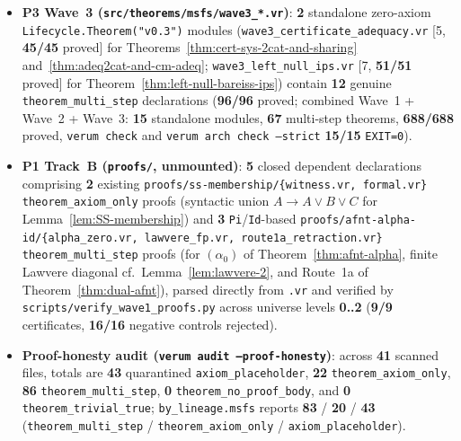 \documentclass[11pt]{article}
\theoremstyle{plain}
\theoremstyle{definition}
\begin{document}
\begin{itemize}[nosep]
\item \textbf{P3 Wave~3 (\texttt{src/\allowbreak theorems/\allowbreak msfs/\allowbreak wave3\_*.vr})}: \textbf{2} standalone zero-axiom \texttt{Lifecycle.\allowbreak Theorem("v0.3")} modules (\texttt{wave3\_\allowbreak certificate\_\allowbreak adequacy.vr} [5, \textbf{45/45} proved] for Theorems~\ref{thm:cert-sys-2cat-and-sharing} and~\ref{thm:adeq2cat-and-cm-adeq}; \texttt{wave3\_\allowbreak left\_\allowbreak null\_\allowbreak ips.vr} [7, \textbf{51/51} proved] for Theorem~\ref{thm:left-null-bareiss-ips}) contain \textbf{12} genuine \texttt{theorem\_multi\_step} declarations (\textbf{96/96} proved; combined Wave~1 + Wave~2 + Wave~3: \textbf{15} standalone modules, \textbf{67} multi-step theorems, \textbf{688/688} proved, \texttt{verum check} and \texttt{verum arch check --strict} \textbf{15/15} \texttt{EXIT=0}).
\item \textbf{P1 Track~B (\texttt{proofs/}, unmounted)}: \textbf{5} closed dependent declarations comprising \textbf{2} existing \texttt{proofs/\allowbreak ss-\allowbreak membership/\allowbreak \{witness.vr, formal.vr\}} \texttt{theorem\_axiom\_only} proofs (syntactic union $A \to A \vee B \vee C$ for Lemma~\ref{lem:SS-membership}) and \textbf{3} \texttt{Pi}/\texttt{Id}-based \texttt{proofs/\allowbreak afnt-\allowbreak alpha-\allowbreak id/\allowbreak \{alpha\_zero.vr, lawvere\_fp.vr, route1a\_retraction.vr\}} \texttt{theorem\_multi\_step} proofs (for $(\alpha_0)$ of Theorem~\ref{thm:afnt-alpha}, finite Lawvere diagonal cf.\ Lemma~\ref{lem:lawvere-2}, and Route~1a of Theorem~\ref{thm:dual-afnt}), parsed directly from \texttt{.vr} and verified by \texttt{scripts/\allowbreak verify\_\allowbreak wave1\_\allowbreak proofs.py} across universe levels \textbf{0..2} (\textbf{9/9} certificates, \textbf{16/16} negative controls rejected).
\item \textbf{Proof-honesty audit (\texttt{verum audit --proof-honesty})}: across \textbf{41} scanned files, totals are \textbf{43} quarantined \texttt{axiom\_placeholder}, \textbf{22} \texttt{theorem\_axiom\_only}, \textbf{86} \texttt{theorem\_multi\_step}, \textbf{0} \texttt{theorem\_no\_proof\_body}, and \textbf{0} \texttt{theorem\_trivial\_true}; \texttt{by\_lineage.\allowbreak msfs} reports \textbf{83} / \textbf{20} / \textbf{43} (\texttt{theorem\_multi\_step} / \texttt{theorem\_axiom\_only} / \texttt{axiom\_placeholder}).

\end{itemize}
\end{document}

